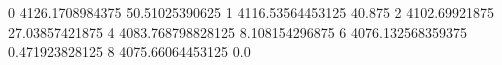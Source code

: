 0 4126.1708984375 50.51025390625
1 4116.53564453125 40.875
2 4102.69921875 27.03857421875
4 4083.768798828125 8.108154296875
6 4076.132568359375 0.471923828125
8 4075.66064453125 0.0
